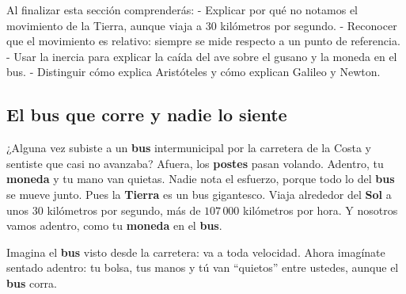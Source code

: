 \documentclass[
  spanish,
  letterpaper,
  12pt,
  oneside,
  open=any,
  DIV=15]{scrbook}
\begin{document}
\begin{tcolorbox}[enhanced jigsaw, arc=.35mm, bottomrule=.15mm, bottomtitle=1mm, breakable, colback=white, colbacktitle=quarto-callout-important-color!10!white, colframe=quarto-callout-important-color-frame, coltitle=black, left=2mm, leftrule=.75mm, opacityback=0, opacitybacktitle=0.6, rightrule=.15mm, title=\textcolor{quarto-callout-important-color}{\faExclamation}\hspace{0.5em}{Conceptos Clave (Objetivos de Aprendizaje)}, titlerule=0mm, toprule=.15mm, toptitle=1mm]

Al finalizar esta sección comprenderás: - Explicar por qué no notamos el
movimiento de la Tierra, aunque viaja a \(30\) kilómetros por segundo. -
Reconocer que el movimiento es relativo: siempre se mide respecto a un
punto de referencia. - Usar la inercia para explicar la caída del ave
sobre el gusano y la moneda en el bus. - Distinguir cómo explica
Aristóteles y cómo explican Galileo y Newton.

\end{tcolorbox}

\subsection{El bus que corre y nadie lo
siente}\label{el-bus-que-corre-y-nadie-lo-siente}

¿Alguna vez subiste a un \textcolor[HTML]{7C3AED}{\textbf{bus}}
intermunicipal por la carretera de la Costa y sentiste que casi no
avanzaba? Afuera, los \textcolor[HTML]{DC2626}{\textbf{postes}} pasan
volando. Adentro, tu \textcolor[HTML]{2563EB}{\textbf{moneda}} y tu mano
van quietas. Nadie nota el esfuerzo, porque todo lo del \textbf{bus} se
mueve junto. Pues la \textcolor[HTML]{7C3AED}{\textbf{Tierra}} es un bus
gigantesco. Viaja alrededor del \textcolor[HTML]{DC2626}{\textbf{Sol}} a
unos \(30\) kilómetros por segundo, más de \(107\,000\) kilómetros por
hora. Y nosotros vamos adentro, como tu \textbf{moneda} en el
\textbf{bus}.

\begin{tcolorbox}[enhanced jigsaw, arc=.35mm, bottomrule=.15mm, bottomtitle=1mm, breakable, colback=white, colbacktitle=quarto-callout-note-color!10!white, colframe=quarto-callout-note-color-frame, coltitle=black, left=2mm, leftrule=.75mm, opacityback=0, opacitybacktitle=0.6, rightrule=.15mm, title=\textcolor{quarto-callout-note-color}{\faInfo}\hspace{0.5em}{Apoyo Visual}, titlerule=0mm, toprule=.15mm, toptitle=1mm]

Imagina el \textbf{bus} visto desde la carretera: va a toda velocidad.
Ahora imagínate sentado adentro: tu bolsa, tus manos y tú van
``quietos'' entre ustedes, aunque el \textbf{bus} corra.

\end{tcolorbox}
\end{document}
